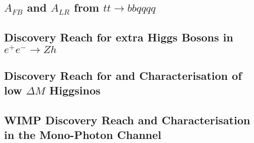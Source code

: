 \subsection{$A_{FB}$ and $A_{LR}$ from $tt \to bb qqqq$}
\subsection{Discovery Reach for extra Higgs Bosons in $e^+e^- \to Zh$}
\subsection{Discovery Reach for and Characterisation of low $\Delta M$ Higgsinos}
\subsection{WIMP Discovery Reach and Characterisation in the Mono-Photon Channel}

